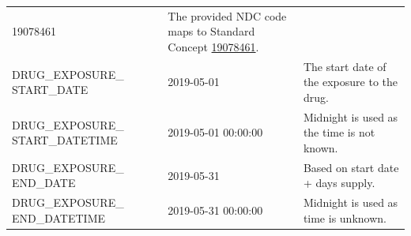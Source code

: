 \documentclass[10.5pt]{book}
\theoremstyle{definition}
\theoremstyle{definition}
\theoremstyle{definition}
\theoremstyle{remark}
\begin{document}
\begin{longtable}[]{@{}lll@{}}
\begin{minipage}[t]{0.16\columnwidth}
19078461\strut
\end{minipage} & \begin{minipage}[t]{0.48\columnwidth}\raggedright\strut
The provided NDC code maps to Standard Concept
\href{http://athena.ohdsi.org/search-terms/terms/19078461}{19078461}.\strut
\end{minipage}\tabularnewline
\begin{minipage}[t]{0.28\columnwidth}\raggedright\strut
DRUG\_EXPOSURE\_ START\_DATE\strut
\end{minipage} & \begin{minipage}[t]{0.16\columnwidth}\raggedright\strut
2019-05-01\strut
\end{minipage} & \begin{minipage}[t]{0.48\columnwidth}\raggedright\strut
The start date of the exposure to the drug.\strut
\end{minipage}\tabularnewline
\begin{minipage}[t]{0.28\columnwidth}\raggedright\strut
DRUG\_EXPOSURE\_ START\_DATETIME\strut
\end{minipage} & \begin{minipage}[t]{0.16\columnwidth}\raggedright\strut
2019-05-01 00:00:00\strut
\end{minipage} & \begin{minipage}[t]{0.48\columnwidth}\raggedright\strut
Midnight is used as the time is not known.\strut
\end{minipage}\tabularnewline
\begin{minipage}[t]{0.28\columnwidth}\raggedright\strut
DRUG\_EXPOSURE\_ END\_DATE\strut
\end{minipage} & \begin{minipage}[t]{0.16\columnwidth}\raggedright\strut
2019-05-31\strut
\end{minipage} & \begin{minipage}[t]{0.48\columnwidth}\raggedright\strut
Based on start date + days supply.\strut
\end{minipage}\tabularnewline
\begin{minipage}[t]{0.28\columnwidth}\raggedright\strut
DRUG\_EXPOSURE\_ END\_DATETIME\strut
\end{minipage} & \begin{minipage}[t]{0.16\columnwidth}\raggedright\strut
2019-05-31 00:00:00\strut
\end{minipage} & \begin{minipage}[t]{0.48\columnwidth}\raggedright\strut
Midnight is used as time is unknown.\strut
\end{minipage}\tabularnewline

\end{longtable}
\end{document}
